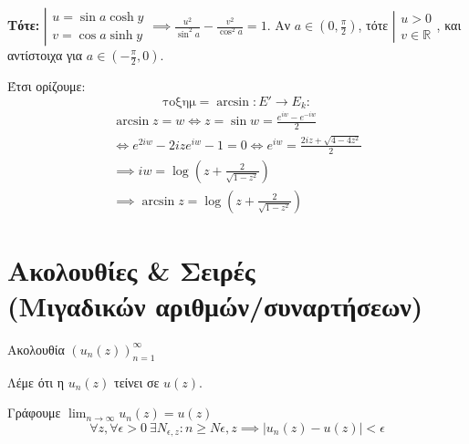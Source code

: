 \documentclass[12pt,a4paper,notitlepage,fleqn]{article}
\begin{document}
\begin{itemize}
\begin{itemize}
     	  	 \textbf{Τότε: } \(
     	  	 \left|
     	  	 \begin{array}{l}
     	  	 u = \sin a \cosh y \\ v = \cos a \sinh y
     	  	 \end{array}
     	  	  \right. \implies \boxed{ \frac{u^2}{\sin^2 a} - \frac{v^2}{\cos^2 a} = 1 }
     	  	  \). Αν \( a \in \left( 0,\frac{\pi}{2} \right) \), τότε \(
     	  	  \left| \begin{array}{l}
     	  	  u > 0 \\ v \in \mathbb R
     	  	  \end{array}  \right.
     	  	   \), και αντίστοιχα για \( a \in \left( -\frac{\pi}{2},0 \right) \).

     	  	   Έτσι ορίζουμε:
     	  	   \[
     	  	   \mathrm{τοξημ } = \arcsin: E' \to E_k:
     	  	   \]
     	  	   \begin{gather*}
     	  	   \arcsin z = w \iff z = \sin w = \frac{e^{iw}-e^{-iw}}{2} \\
     	  	   \iff e^{2iw}-2ize^{iw}-1 = 0 \iff e^{iw} = \frac{2iz+\sqrt{4-4z^2}}{2}
     	  	   \\ \implies iw = \log\left( z+\frac{2}{\sqrt{1-z^2}} \right) \\
     	  	   \implies \boxed{
     	  	   	\arcsin z = \log\left(
     	  	   	z+\frac{2}{\sqrt{1-z^2}}
     	  	   	\right)
     	  	   	}
     	  	   \end{gather*}
     	  \end{itemize}

     \end{itemize}

     \section{Ακολουθίες \& Σειρές\\(Μιγαδικών αριθμών/συναρτήσεων)}
     \begin{defn*}{}
     	Ακολουθία \(\displaystyle \left( u_n(z) \right)_{n=1}^\infty \)
     \end{defn*}
     \begin{defn*}{}
     	Λέμε ότι η \( u_n(z) \) τείνει σε \( u(z) \).

     	Γράφουμε \( \displaystyle \lim_{n\to \infty} u_n(z)=u(z) \)
     	\[
     	\forall z,\forall\epsilon > 0 \ \exists N_{\epsilon,z}:
     	n \geq N{\epsilon,z} \implies \left| u_n(z)-u(z) \right|<\epsilon
     	\]
     \end{defn*}
\end{document}
